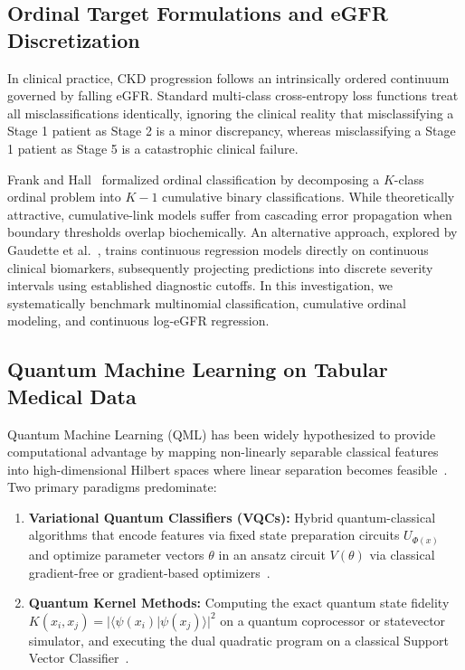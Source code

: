 \documentclass[conference]{IEEEtran}
\begin{document}
\subsection{Ordinal Target Formulations and eGFR Discretization}
In clinical practice, CKD progression follows an intrinsically ordered continuum governed by falling eGFR. Standard multi-class cross-entropy loss functions treat all misclassifications identically, ignoring the clinical reality that misclassifying a Stage 1 patient as Stage 2 is a minor discrepancy, whereas misclassifying a Stage 1 patient as Stage 5 is a catastrophic clinical failure.

Frank and Hall~\cite{frank2001simple} formalized ordinal classification by decomposing a $K$-class ordinal problem into $K-1$ cumulative binary classifications. While theoretically attractive, cumulative-link models suffer from cascading error propagation when boundary thresholds overlap biochemically. An alternative approach, explored by Gaudette et al.~\cite{gaudette2016evaluation}, trains continuous regression models directly on continuous clinical biomarkers, subsequently projecting predictions into discrete severity intervals using established diagnostic cutoffs. In this investigation, we systematically benchmark multinomial classification, cumulative ordinal modeling, and continuous log-eGFR regression.

\subsection{Quantum Machine Learning on Tabular Medical Data}
Quantum Machine Learning (QML) has been widely hypothesized to provide computational advantage by mapping non-linearly separable classical features into high-dimensional Hilbert spaces where linear separation becomes feasible~\cite{havlicek2019supervised, schuld2019quantum}. Two primary paradigms predominate:
\begin{enumerate}
    \item \textbf{Variational Quantum Classifiers (VQCs):} Hybrid quantum-classical algorithms that encode features via fixed state preparation circuits $U_{\Phi(x)}$ and optimize parameter vectors $\theta$ in an ansatz circuit $V(\theta)$ via classical gradient-free or gradient-based optimizers~\cite{cerezo2021variational}.
    \item \textbf{Quantum Kernel Methods:} Computing the exact quantum state fidelity $K(x_i, x_j) = |\langle \psi(x_i) | \psi(x_j) \rangle|^2$ on a quantum coprocessor or statevector simulator, and executing the dual quadratic program on a classical Support Vector Classifier~\cite{schuld2021quantum}.
\end{enumerate}
\end{document}
